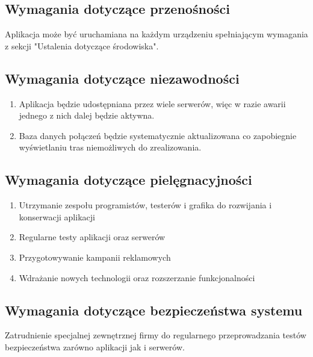 \documentclass[12pt,a4paper]{report}
\begin{document}
\subsection{Wymagania dotyczące przenośności}
	Aplikacja może być uruchamiana na każdym urządzeniu spełniającym wymagania z sekcji "Ustalenia dotyczące środowiska".
\subsection{Wymagania dotyczące niezawodności}
\begin{enumerate}
	\item Aplikacja będzie udostępniana przez wiele serwerów, więc w razie awarii jednego z nich dalej będzie aktywna.
	\item Baza danych połączeń będzie systematycznie aktualizowana co zapobiegnie wyświetlaniu tras niemożliwych do zrealizowania.
\end{enumerate}
\subsection{Wymagania dotyczące pielęgnacyjności}
\begin{enumerate}
	\item Utrzymanie zespołu programistów, testerów i grafika do rozwijania i konserwacji aplikacji
	\item Regularne testy aplikacji oraz serwerów
	\item Przygotowywanie kampanii reklamowych
	\item Wdrażanie nowych technologii oraz rozszerzanie funkcjonalności
\end{enumerate}	
\subsection{Wymagania dotyczące bezpieczeństwa systemu}
	Zatrudnienie specjalnej zewnętrznej firmy do regularnego przeprowadzania testów bezpieczeństwa zarówno aplikacji jak i serwerów.
\end{document}
